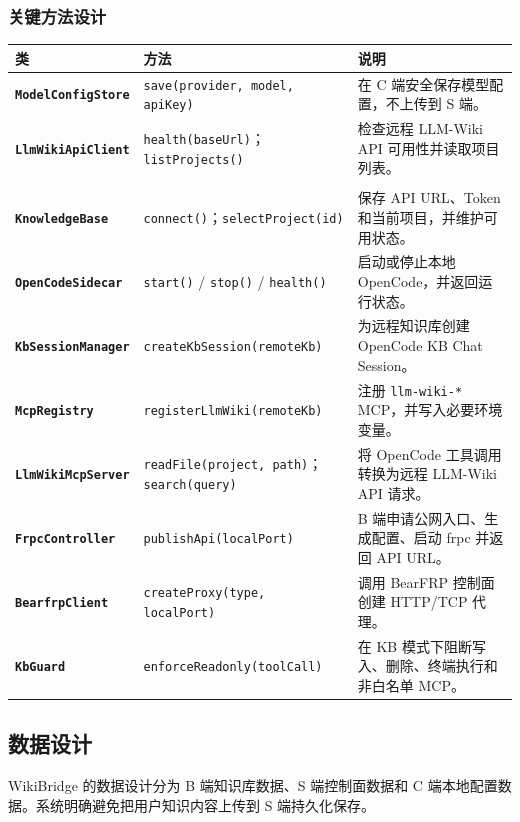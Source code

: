 \documentclass[UTF8,a4paper,12pt,fontset=fandol]{ctexart}
\newcommand{\code}[1]{\texttt{\footnotesize #1}}
\begin{document}
\subsubsection{关键方法设计}
\begin{longtable}{>{\bfseries}p{3.2cm}p{5.6cm}p{5.3cm}}
\toprule
类 & 方法 & 说明 \\
\midrule
\code{ModelConfigStore} & \code{save(provider, model, apiKey)} & 在 C 端安全保存模型配置，不上传到 S 端。 \\
\code{LlmWikiApiClient} & \code{health(baseUrl)}；\code{listProjects()} & 检查远程 LLM-Wiki API 可用性并读取项目列表。 \\
\begin{tabular}[t]{@{}l@{}}\code{Remote}\\\code{KnowledgeBase}\end{tabular} & \code{connect()}；\code{selectProject(id)} & 保存 API URL、Token 和当前项目，并维护可用状态。 \\
\code{OpenCodeSidecar} & \code{start()} / \code{stop()} / \code{health()} & 启动或停止本地 OpenCode，并返回运行状态。 \\
\code{KbSessionManager} & \code{createKbSession(remoteKb)} & 为远程知识库创建 OpenCode KB Chat Session。 \\
\code{McpRegistry} & \code{registerLlmWiki(remoteKb)} & 注册 \code{llm-wiki-*} MCP，并写入必要环境变量。 \\
\code{LlmWikiMcpServer} & \code{readFile(project, path)}；\code{search(query)} & 将 OpenCode 工具调用转换为远程 LLM-Wiki API 请求。 \\
\code{FrpcController} & \code{publishApi(localPort)} & B 端申请公网入口、生成配置、启动 frpc 并返回 API URL。 \\
\code{BearfrpClient} & \code{createProxy(type, localPort)} & 调用 BearFRP 控制面创建 HTTP/TCP 代理。 \\
\code{KbGuard} & \code{enforceReadonly(toolCall)} & 在 KB 模式下阻断写入、删除、终端执行和非白名单 MCP。 \\
\bottomrule
\end{longtable}

\subsection{数据设计}
WikiBridge 的数据设计分为 B 端知识库数据、S 端控制面数据和 C 端本地配置数据。系统明确避免把用户知识内容上传到 S 端持久化保存。
\end{document}
